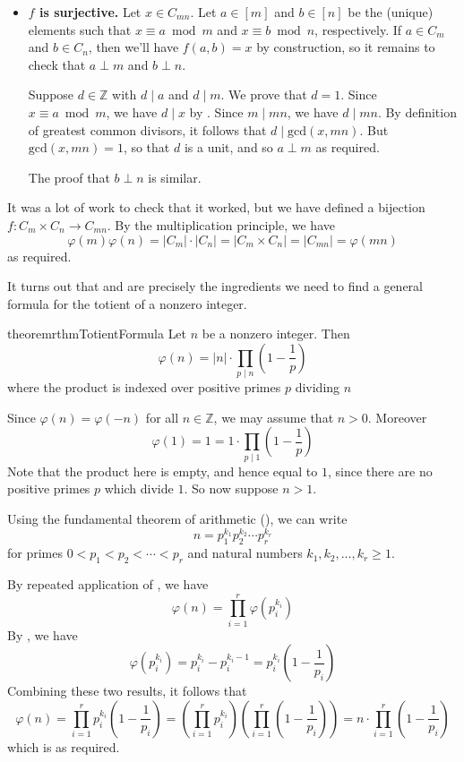 \begin{cproof}
\begin{itemize}
\item \textbf{$f$ is surjective.} Let $x \in C_{mn}$. Let $a \in [m]$ and $b \in [n]$ be the (unique) elements such that $x \equiv a \bmod m$ and $x \equiv b \bmod n$, respectively. If $a \in C_m$ and $b \in C_n$, then we'll have $f(a,b)=x$ by construction, so it remains to check that $a \perp m$ and $b \perp n$.

Suppose $d \in \mathbb{Z}$ with $d \mid a$ and $d \mid m$. We prove that $d=1$. Since $x \equiv a \bmod m$, we have $d \mid x$ by . Since $m \mid mn$, we have $d \mid mn$. By definition of greatest common divisors, it follows that $d \mid \mathrm{gcd}(x,mn)$. But $\mathrm{gcd}(x,mn)=1$, so that $d$ is a unit, and so $a \perp m$ as required.

The proof that $b \perp n$ is similar.
\end{itemize}
It was a lot of work to check that it worked, but we have defined a bijection $f : C_m \times C_n \to C_{mn}$. By the multiplication principle, we have
\[ \varphi(m) \varphi(n) = |C_m| \cdot |C_n| = |C_m \times C_n| = |C_{mn}| = \varphi(mn) \]
as required.
\end{cproof}

It turns out that  and  are precisely the ingredients we need to find a general formula for the totient of a nonzero integer.

\begin{restatable}{theorem}{rthmTotientFormula}
\label{thmTotientFormula}
Let $n$ be a nonzero integer. Then
\[ \varphi(n) = |n| \cdot \prod_{p \mid n} \left( 1 - \frac{1}{p} \right) \]
where the product is indexed over positive primes $p$ dividing $n$
\end{restatable}
\begin{cproof}
Since $\varphi(n) = \varphi(-n)$ for all $n \in \mathbb{Z}$, we may assume that $n>0$. Moreover
\[ \varphi(1) = 1 = 1 \cdot \prod_{p \mid 1} \left( 1 - \frac{1}{p} \right) \]
Note that the product here is empty, and hence equal to $1$, since there are no positive primes $p$ which divide $1$. So now suppose $n>1$.

Using the fundamental theorem of arithmetic (), we can write
\[ n = p_1^{k_1}p_2^{k_2} \cdots p_r^{k_r} \]
for primes $0<p_1<p_2<\cdots<p_r$ and natural numbers $k_1,k_2,\dots,k_r \ge 1$.

By repeated application of , we have
\[ \varphi(n) = \prod_{i=1}^r \varphi(p_i^{k_i}) \]
By , we have
\[ \varphi(p_i^{k_i}) = p_i^{k_i}-p_i^{k_i-1} = p_i^{k_i} \left( 1-\frac{1}{p_i} \right) \]
Combining these two results, it follows that
\[ \varphi(n) = \prod_{i=1}^r p_i^{k_i} \left( 1 - \frac{1}{p_i} \right) = \left(\prod_{i=1}^r p_i^{k_i} \right) \left( \prod_{i=1}^r \left( 1 - \frac{1}{p_i} \right) \right) = n \cdot \prod_{i=1}^r \left( 1 - \frac{1}{p_i} \right) \]
which is as required.
\end{cproof}